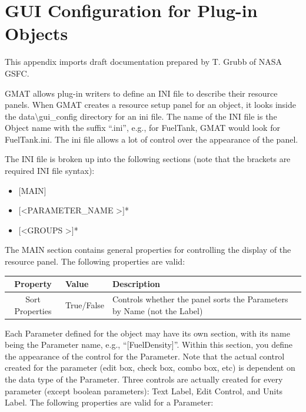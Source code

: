 \documentclass[10pt,letterpaper]{article}
\begin{document}
\appendix

\section{GUI Configuration for Plug-in Objects}

This appendix imports draft documentation prepared by T. Grubb of NASA GSFC\cite{GuiIni}.

GMAT allows plug-in writers to define an INI file to describe their resource panels.  When GMAT creates a resource setup panel for an object, it looks inside the data{\textbackslash}gui\_config directory for an ini file.  The name of the INI file is the Object name with the suffix ``.ini'', e.g., for FuelTank, GMAT would look for FuelTank.ini.  The ini file allows a lot of control over the appearance of the panel.

The INI file is broken up into the following sections (note that the brackets are required INI file syntax):

\begin{itemize}
\item $[$MAIN$]$
\item $[$\textless PARAMETER\_NAME \textgreater$]$*
\item $[$\textless GROUPS \textgreater$]$*
\end{itemize}

The MAIN section contains general properties for controlling the display of the resource panel.  The following properties are valid:

\begin{center}
\begin{tabular}{|c|l|p{3.5in}|}
\hline 
\textbf{Property} & \textbf{Value} & \textbf{Description} \\ 
\hline 
Sort Properties & True/False & Controls whether the panel sorts the Parameters by Name (not the Label) \\ 
\hline 
\end{tabular} 
\end{center}

Each Parameter defined for the object may have its own section, with its name being the Parameter name, e.g., ``[FuelDensity]''.  Within this section, you define the appearance of the control for the Parameter.  Note that the actual control created for the parameter (edit box, check box, combo box, etc) is dependent on the data type of the Parameter.  Three controls are actually created for every parameter (except boolean parameters): Text Label, Edit Control, and Units Label.  The following properties are valid for a Parameter:
\end{document}
